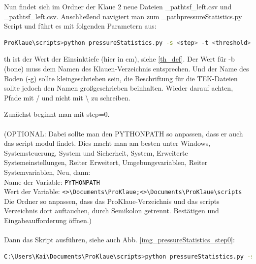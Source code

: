 \documentclass[a4paper, openany, oneside]{memoir}
\begin{document}
Nun findet sich im Ordner der Klaue 2 neue Dateien \File_path{tsf_left.csv} und \File_path{tsf_left.csv}. Anschließend navigiert man zum \File_path{pressureStatistics.py} Script und führt es mit folgenden Parametern aus:


\begin{minipage}[c]{\textwidth}
\begin{lstlisting}[language=bash]
ProKlaue\scripts>python pressureStatistics.py -s <step> -t <threshold> -b "<klauenname>" -g "<bodentyp>" -d "<base_directory>"
\end{lstlisting}
\end{minipage}

th ist der Wert der Einsinktiefe (hier in cm), siehe \ref{th_def}. Der Wert für -b (bone) muss dem Namen des Klauen-Verzeichnis entsprechen. Und der Name des Boden (-g) sollte kleingeschrieben sein, die Beschriftung für die TEK-Dateien sollte jedoch den Namen großgeschrieben beinhalten. Wieder darauf achten, Pfade mit / und nicht mit \textbackslash{} zu schreiben.

Zunächst beginnt man mit step=0. 
\\\\
(OPTIONAL: Dabei sollte man den PYTHONPATH so anpassen, dass er auch das script modul findet. Dies macht man am besten unter Windows, Systemsteuerung, System und Sicherheit, System, Erweiterte Systemeinstellungen, Reiter Erweitert, Umgebungsvariablen, Reiter Systemvariablen, Neu, dann:\\
Name der Variable: \texttt{PYTHONPATH}\\
Wert der Variable: \texttt{<>\textbackslash Documents\textbackslash ProKlaue;<>\textbackslash Documents\textbackslash ProKlaue\textbackslash scripts}\\
Die Ordner so anpassen, dass das ProKlaue-Verzeichnis und das scripts Verzeichnis dort auftauchen, durch Semikolon getrennt. Bestätigen und Eingabeaufforderung öffnen.)\\
\\
Dann das Skript ausführen, siehe auch Abb. \ref{img_pressureStatistics_step0}:

\begin{minipage}[c]{\textwidth}
\begin{lstlisting}[language=bash]
C:\Users\Kai\Documents\ProKlaue\scripts>python pressureStatistics.py -s 0 -t 0.5 -b "Klaue 1 (K1T)" -g "gummi" -d "C:/Users/Kai/Documents/ProKlaue/testdaten/druck"
\end{lstlisting}
\end{minipage}
\end{document}
